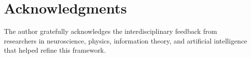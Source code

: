 \documentclass[12pt]{article}
\begin{document}
\section*{Acknowledgments}
The author gratefully acknowledges the interdisciplinary feedback from researchers in neuroscience, physics, information theory, and artificial intelligence that helped refine this framework.
\end{document}
